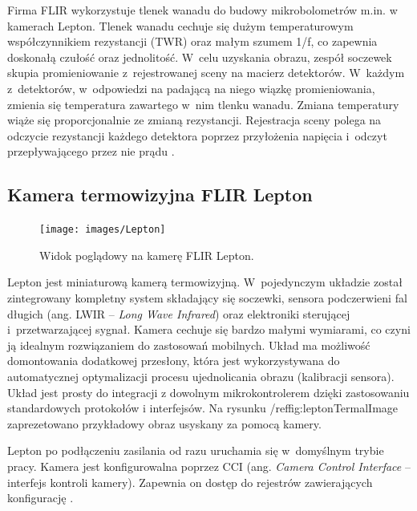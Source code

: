 Firma FLIR wykorzystuje tlenek wanadu do budowy mikrobolometrów m.in. w kamerach Lepton. 
Tlenek wanadu cechuje się dużym temperaturowym współczynnikiem rezystancji (TWR) oraz małym szumem 1/f, co zapewnia doskonałą czułość oraz jednolitość. 
W~celu uzyskania obrazu, zespół soczewek skupia promieniowanie z~rejestrowanej sceny na macierz detektorów. 
W~każdym z~detektorów, w~odpowiedzi na padającą na niego wiązkę promieniowania, zmienia się temperatura zawartego w~nim tlenku wanadu. 
Zmiana temperatury wiąże się proporcjonalnie ze zmianą rezystancji. 
Rejestracja sceny polega na odczycie rezystancji każdego detektora poprzez przyłożenia napięcia i~odczyt przepływającego przez nie prądu \cite{flir:lepton}.


\subsection{Kamera termowizyjna FLIR Lepton}
\begin{figure}[h]
\centering
\texttt{[image: images/Lepton]}
\caption{Widok poglądowy na kamerę FLIR Lepton.}
\label{fig:lepton}
\end{figure}

Lepton jest miniaturową kamerą termowizyjną. 
W~pojedynczym układzie został zintegrowany kompletny system składający się soczewki, sensora podczerwieni fal długich (ang. LWIR -- \textit{Long Wave Infrared}) oraz elektroniki sterującej i~przetwarzającej sygnał.
Kamera cechuje się bardzo małymi wymiarami, co czyni ją idealnym rozwiązaniem do zastosowań mobilnych.
Układ ma możliwość domontowania dodatkowej przesłony, która jest wykorzystywana do automatycznej optymalizacji procesu ujednolicania obrazu (kalibracji sensora).
Układ jest prosty do integracji z dowolnym mikrokontrolerem dzięki zastosowaniu standardowych protokołów i interfejsów. Na rysunku /ref{fig:leptonTermalImage} zaprezetowano przykładowy obraz usyskany za pomocą kamery.

Lepton po podłączeniu zasilania od razu uruchamia się w~domyślnym trybie pracy. 
Kamera jest konfigurowalna poprzez CCI (ang. \textit{Camera Control Interface} – interfejs kontroli kamery).
Zapewnia on dostęp do rejestrów zawierających konfigurację \cite{flir:lepton}. 

